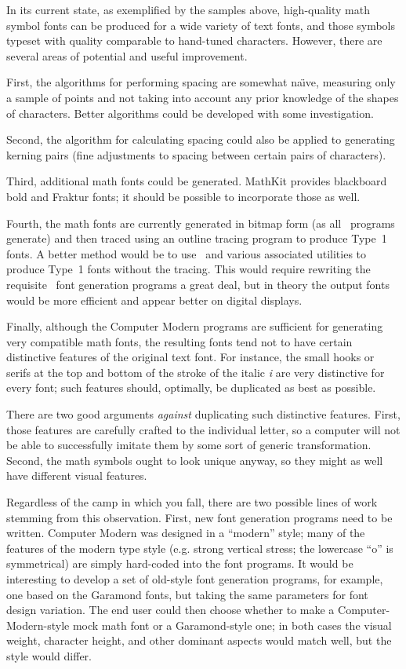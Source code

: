 \documentclass[preprint]{ltugproc}
\begin{document}
In its current state, as exemplified by the samples above, high-quality math
symbol fonts can be produced for a wide variety of text fonts, and those symbols
typeset with quality comparable to hand-tuned characters. However, there are
several areas of potential and useful improvement.

First, the algorithms for performing spacing are somewhat na\"\i ve, measuring
only a sample of points and not taking into account any prior knowledge of the
shapes of characters. Better algorithms could be developed with some
investigation.

Second, the algorithm for calculating spacing could also be applied to
generating kerning pairs (fine adjustments to spacing between certain pairs of
characters).

Third, additional math fonts could be generated. MathKit provides blackboard
bold and Fraktur fonts; it should be possible to incorporate those as well.

Fourth, the math fonts are currently generated in bitmap form (as all \MF\
programs generate) and then traced using an outline tracing program to produce
Type~1 fonts. A better method would be to use \MP\ and various associated
utilities to produce Type~1 fonts without the tracing. This would require
rewriting the requisite \MF\ font generation programs a great deal, but in
theory the output fonts would be more efficient and appear better on digital
displays.

Finally, although the Computer Modern programs are sufficient for generating
very compatible math fonts, the resulting fonts tend not to have certain
distinctive features of the original text font. For instance, the small hooks or
serifs at the top and bottom of the stroke of the italic \emph{i} are very
distinctive for every font; such features should, optimally, be duplicated as
best as possible.

There are two good arguments \emph{against} duplicating such distinctive
features. First, those features are carefully crafted to the individual
letter, so a computer will not be able to successfully imitate them by some sort
of generic transformation. Second, the math symbols ought to look unique anyway,
so they might as well have different visual features.

Regardless of the camp in which you fall, there are two possible lines of work
stemming from this observation. First, new font generation programs need to be
written. Computer Modern was designed in a ``modern'' style; many of the
features of the modern type style (e.g. strong vertical stress; the lowercase
``o'' is symmetrical) are simply hard-coded into the font programs. It would be
interesting to develop a set of old-style font generation programs, for example,
one based on the Garamond fonts, but taking the same parameters for font design
variation. The end user could then choose whether to make a
Computer-Modern-style mock math font or a Garamond-style one; in both cases the
visual weight, character height, and other dominant aspects would match well,
but the style would differ.
\end{document}
